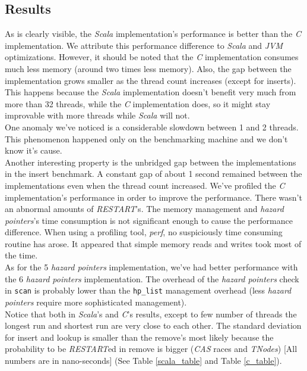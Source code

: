 \documentclass[conference]{IEEEtran}
\begin{document}
\subsection{Results}
	As is clearly visible, the \textit{Scala} implementation's performance is better than the \textit{C} implementation. We attribute this performance difference to \textit{Scala} and \textit{JVM} optimizations. However, it should be noted that the \textit{C} implementation consumes much less memory (around two times less memory). Also, the gap between the implementation grows smaller as the thread count increases (except for inserts). This happens because the \textit{Scala} implementation doesn't benefit very much from more than 32 threads, while the \textit{C} implementation does, so it might stay improvable with more threads while \textit{Scala} will not. \\
	One anomaly we've noticed is a considerable slowdown between 1 and 2 threads. This phenomenon happened only on the benchmarking machine and we don't know it's cause.\\
	Another interesting property is the unbridged gap between the implementations in the insert benchmark. A constant gap of about 1 second remained between the implementations even when the thread count increased. We've profiled the \textit{C} implementation's performance in order to improve the performance. There wasn't an abnormal amounts of \textit{RESTART}'s. The memory management and \textit{hazard pointers}'s time consumption is not significant enough to cause the performance difference. When using a profiling tool, \textit{perf}\cite{wiki-perf}, no suspiciously time consuming routine has arose. It appeared that simple memory reads and writes took most of the time. \\
	As for the 5 \textit{hazard pointers} implementation, we've had better performance with the 6 \textit{hazard pointers} implementation. The overhead of the \textit{hazard pointers} check in \texttt{scan} is probably lower than the \texttt{hp\_list} management overhead (less \textit{hazard pointers} require more sophisticated management). \\
	Notice that both in \textit{Scala}'s and \textit{C}'s results, except to few number of threads the longest run and shortest run are very close to each other. The standard deviation for insert and lookup is smaller than the remove's most likely because the probability to be \textit{RESTART}ed in remove is bigger (\textit{CAS} races and \textit{TNodes}) [All numbers are in nano-seconds] (See Table \ref{scala_table} and Table \ref{c_table}).   
	
\end{document}
